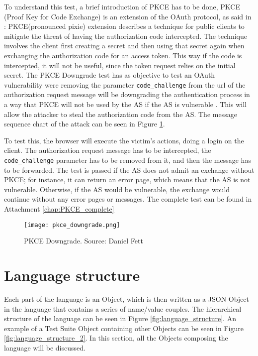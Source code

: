 To understand this test, a brief introduction of \gls{PKCE} has to be done, \gls{PKCE} (Proof Key for Code Exchange) is an extension of the \gls{OAuth} protocol, as said in \cite{pkce_explanation}: \gls{PKCE}(pronounced pixie) extension describes a technique for public clients to mitigate the threat of having the authorization code intercepted. The technique involves the client first creating a secret and then using that secret again when exchanging the authorization code for an access token. This way if the code is intercepted, it will not be useful, since the token request relies on the initial secret. 
The \gls{PKCE} Downgrade test has as objective to test an \gls{OAuth} vulnerability were removing the parameter \texttt{code\_challenge} from the url of the authorization request message will be downgrading the authentication process in a way that \gls{PKCE} will not be used by the AS if the AS is vulnerable \cite{pkce_downgrade}. This will allow the attacker to steal the authorization code from the AS. The message sequence chart of the attack can be seen in Figure \ref{fig:pkce_downgrade}.

To test this, the browser will execute the victim's actions, doing a login on the client. The authorization request message has to be intercepted, the \texttt{code\_challenge} parameter has to be removed from it, and then the message has to be forwarded. The test is passed if the AS does not admit an exchange without PKCE; for instance, it can return an error page, which means that the AS is not vulnerable. Otherwise, if the AS would be vulnerable, the exchange would continue without any error pages or messages.
The complete test can be found in Attachment \ref{chap:PKCE_complete}

\begin{figure}[h]
    \texttt{[image: pkce\_downgrade.png]}
    \caption{PKCE Downgrade. Source: Daniel Fett \cite{pkce_msc_image}}
    \label{fig:pkce_downgrade}
\end{figure}

\section{Language structure}
Each part of the language is an Object, which is then written as a JSON Object in the language that contains a series of name/value couples. The hierarchical structure of the language can be seen in Figure \ref{fig:language_structure}. An example of a Test Suite Object containing other Objects can be seen in Figure \ref{fig:language_structure_2}. In this section, all the Objects composing the language will be discussed.

